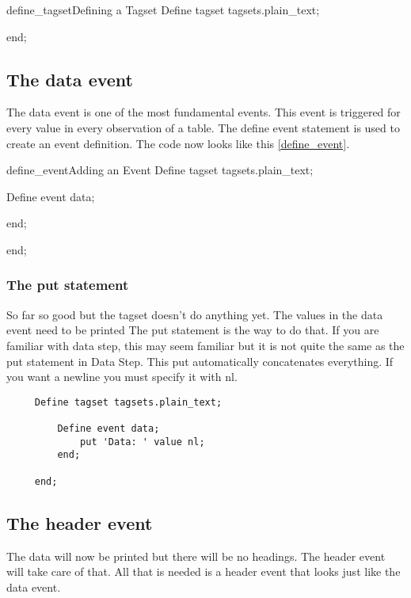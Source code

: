 \begin{fvcode}{define_tagset}{Defining a Tagset}
     Define tagset tagsets.plain_text;

     end; 
\end{fvcode}

       
\subsection{The data event}
The data event is one of the most fundamental events.   This
event is triggered for every value in every observation of a table.  
The define event statement is used to create an event definition.
The code now looks like this \vref{define_event}.

\begin{fvcode}{define_event}{Adding an Event}
     Define tagset tagsets.plain_text;

         Define event data;

         end;

     end; 
\end{fvcode}

\subsubsection{The put statement}
So far so good but the tagset doesn't do anything yet.  The values in the
data event need to be printed
The put statement is the way to do that.  If you are familiar with data step,
this may seem familiar but it is not quite the same as the put statement in Data Step.
This put automatically concatenates everything.  If you want a newline you must
specify it with nl.  

\begin{lstlisting}
     Define tagset tagsets.plain_text;

         Define event data;
             put 'Data: ' value nl;
         end;

     end; 
\end{lstlisting}

\subsection{The header event}
The data will now be printed but there will be no headings.  The
header event will take care of that.  All that is needed is a 
header event that looks just like the data event.

